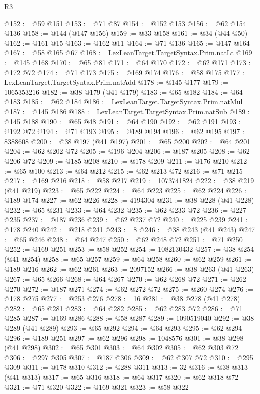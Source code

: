 \begin{lexlean}{R3}
\begin{coremodule}
@152 := @59 @151
@153 := @71 @87
@154 := @152 @153
@156 := @62 @154 @136
@158 := @144 (@147 @156)
@159 := @33 @158
@161 := @34 (@44 @50)
@162 := @161 @15
@163 := @162 @11
@164 := @71 @136
@165 := @147 @164
@167 := @58 @165 @67
@168 := LexLeanTarget.TargetSyntax.Prim.natLt
@169 := @145 @168
@170 := @65 @81
@171 := @64 @170
@172 := @62 @171
@173 := @172 @72
@174 := @71 @173
@175 := @169 @174
@176 := @58 @175
@177 := LexLeanTarget.TargetSyntax.Prim.natAdd
@178 := @145 @177
@179 := 1065353216
@182 := @38 @179 (@41 @179)
@183 := @65 @182
@184 := @64 @183
@185 := @62 @184
@186 := LexLeanTarget.TargetSyntax.Prim.natMul
@187 := @145 @186
@188 := LexLeanTarget.TargetSyntax.Prim.natSub
@189 := @145 @188
@190 := @65 @48
@191 := @64 @190
@192 := @62 @191
@193 := @192 @72
@194 := @71 @193
@195 := @189 @194
@196 := @62 @195
@197 := 8388608
@200 := @38 @197 (@41 @197)
@201 := @65 @200
@202 := @64 @201
@204 := @62 @202 @72
@205 := @196 @204
@206 := @187 @205
@208 := @62 @206 @72
@209 := @185 @208
@210 := @178 @209
@211 := @176 @210
@212 := @65 @100
@213 := @64 @212
@215 := @62 @213 @72
@216 := @71 @215
@217 := @169 @216
@218 := @58 @217
@219 := 1073741824
@222 := @38 @219 (@41 @219)
@223 := @65 @222
@224 := @64 @223
@225 := @62 @224
@226 := @189 @174
@227 := @62 @226
@228 := 4194304
@231 := @38 @228 (@41 @228)
@232 := @65 @231
@233 := @64 @232
@235 := @62 @233 @72
@236 := @227 @235
@237 := @187 @236
@239 := @62 @237 @72
@240 := @225 @239
@241 := @178 @240
@242 := @218 @241
@243 := 8
@246 := @38 @243 (@41 @243)
@247 := @65 @246
@248 := @64 @247
@250 := @62 @248 @72
@251 := @71 @250
@252 := @169 @251
@253 := @58 @252
@254 := 1082130432
@257 := @38 @254 (@41 @254)
@258 := @65 @257
@259 := @64 @258
@260 := @62 @259
@261 := @189 @216
@262 := @62 @261
@263 := 2097152
@266 := @38 @263 (@41 @263)
@267 := @65 @266
@268 := @64 @267
@270 := @62 @268 @72
@271 := @262 @270
@272 := @187 @271
@274 := @62 @272 @72
@275 := @260 @274
@276 := @178 @275
@277 := @253 @276
@278 := 16
@281 := @38 @278 (@41 @278)
@282 := @65 @281
@283 := @64 @282
@285 := @62 @283 @72
@286 := @71 @285
@287 := @169 @286
@288 := @58 @287
@289 := 1090519040
@292 := @38 @289 (@41 @289)
@293 := @65 @292
@294 := @64 @293
@295 := @62 @294
@296 := @189 @251
@297 := @62 @296
@298 := 1048576
@301 := @38 @298 (@41 @298)
@302 := @65 @301
@303 := @64 @302
@305 := @62 @303 @72
@306 := @297 @305
@307 := @187 @306
@309 := @62 @307 @72
@310 := @295 @309
@311 := @178 @310
@312 := @288 @311
@313 := 32
@316 := @38 @313 (@41 @313)
@317 := @65 @316
@318 := @64 @317
@320 := @62 @318 @72
@321 := @71 @320
@322 := @169 @321
@323 := @58 @322

\end{coremodule}
\end{lexlean}
